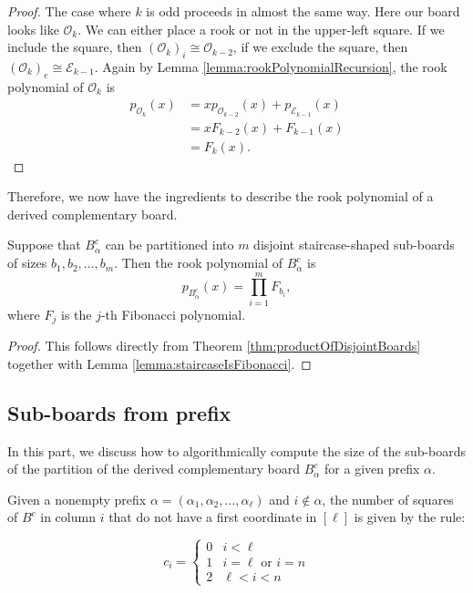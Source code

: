 \begin{proof}
  The case where $k$ is odd proceeds in almost the same way.
  Here our board looks like $\mathcal{O}_{k}$.
  We can either place a rook or not in the upper-left square.
  If we include the square, then $(\mathcal{O}_{k})_i \cong \mathcal{O}_{k-2}$,
  if we exclude the square, then $(\mathcal{O}_{k})_e \cong \mathcal{E}_{k-1}$.
  Again by Lemma \ref{lemma:rookPolynomialRecursion}, the rook polynomial
  of $\mathcal{O}_{k}$ is
  \begin{align}
    p_{\mathcal{O}_{k}}(x)
    &= xp_{\mathcal{O}_{k-2}}(x) + p_{\mathcal{E}_{k-1}}(x) \\
    &= xF_{k-2}(x) + F_{k-1}(x) \\
    &= F_{k}(x).
  \end{align}
\end{proof}

Therefore, we now have the ingredients to describe the rook polynomial of
a derived complementary board.

\begin{corollary}
  Suppose that $B_\alpha^c$ can be partitioned into $m$ disjoint
  staircase-shaped sub-boards of sizes $b_1, b_2, \dots, b_m$.
  Then the rook polynomial of
  $B_\alpha^c$ is \begin{equation}
    p_{B_\alpha^c}(x) = \prod_{i=1}^m F_{b_i},
  \end{equation} where $F_j$ is the $j$-th Fibonacci polynomial.
  \label{cor:derivedComplementaryRookPolynomial}
\end{corollary}
\begin{proof}
  This follows directly from Theorem \ref{thm:productOfDisjointBoards} together
  with Lemma \ref{lemma:staircaseIsFibonacci}.
\end{proof}

\subsection{Sub-boards from prefix}

In this part, we discuss how to algorithmically compute the size of the
sub-boards of the partition of the derived complementary board $B_\alpha^c$
for a given prefix $\alpha$.

\begin{lemma}
  Given a nonempty prefix $\alpha = (\alpha_1, \alpha_2, \dots, \alpha_\ell)$
  and $i \not\in \alpha$,
  the number of squares of $B^c$ in column $i$ that do not have
  a first coordinate in $[\ell]$
  is given by the rule:
  \begin{singlespace}
  \begin{equation}
    c_i = \begin{cases}
      0 & i < \ell \\
      1 & i = \ell \text{ or } i = n \\
      2 & \ell < i < n
    \end{cases}
  \end{equation}
  \end{singlespace}
\end{lemma}

